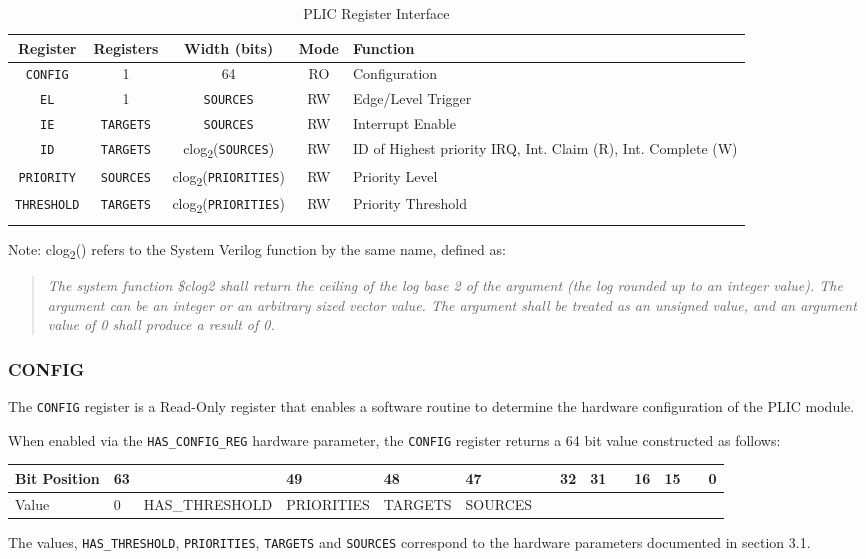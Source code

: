 \documentclass[]{article}
\begin{document}
\begin{longtable}[]{@{}ccccp{3cm}@{}}
\toprule
\textbf{Register} & \textbf{Registers} & \textbf{Width (bits)} & \textbf{Mode} & \textbf{Function}\tabularnewline
\midrule
\endhead
\texttt{CONFIG} & 1 & 64 & RO & Configuration\tabularnewline
\texttt{EL} & 1 & \texttt{SOURCES} & RW & Edge/Level Trigger\tabularnewline
\texttt{IE} & \texttt{TARGETS} & \texttt{SOURCES} & RW & Interrupt Enable\tabularnewline
\texttt{ID} & \texttt{TARGETS} & clog\textsubscript{2}(\texttt{SOURCES}) & RW & ID of Highest priority IRQ, Int. Claim (R), Int. Complete (W)\tabularnewline
\texttt{PRIORITY} & \texttt{SOURCES} & clog\textsubscript{2}(\texttt{PRIORITIES}) & RW & Priority Level\tabularnewline
\texttt{THRESHOLD} & \texttt{TARGETS} & clog\textsubscript{2}(\texttt{PRIORITIES}) & RW & Priority Threshold\tabularnewline
\bottomrule
\caption{PLIC Register Interface}
\label{tab:REGIF}
\end{longtable}

Note: clog\textsubscript{2}() refers to the System Verilog function by
the same name, defined as:

\begin{quote}
\emph{The system function \$clog2 shall return the ceiling of the log
base 2 of the argument (the log rounded up to an integer value). The
argument can be an integer or an arbitrary sized vector value. The
argument shall be treated as an unsigned value, and an argument value of
0 shall produce a result of 0.}
\end{quote}

\subsubsection{CONFIG}

The \texttt{CONFIG} register is a Read-Only register that enables a
software routine to determine the hardware configuration of the PLIC
module.

When enabled via the \texttt{HAS\_CONFIG\_REG} hardware parameter, the
\texttt{CONFIG} register returns a 64 bit value constructed as follows:

\begin{longtable}[]{@{}llllllllllllll@{}}
\toprule
Bit Position & 63 & & 49 & 48 & 47 & & 32 & 31 & & 16 & 15 & &
0\tabularnewline
\midrule
\endhead
Value & 0 & HAS\_THRESHOLD & PRIORITIES & TARGETS & SOURCES & & & & & &
& &\tabularnewline
\bottomrule
\end{longtable}

The values, \texttt{HAS\_THRESHOLD}, \texttt{PRIORITIES},
\texttt{TARGETS} and \texttt{SOURCES} correspond to the hardware
parameters documented in section 3.1.
\end{document}
